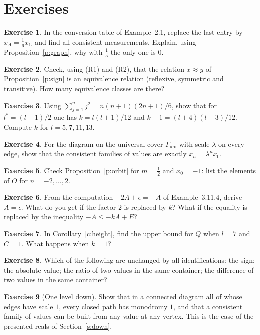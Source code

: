 \documentclass[11pt,a4paper]{article}
\newcommand{\Guni}{\Gamma_{\mathrm{uni}}}
\theoremstyle{plain}
\theoremstyle{definition}
\newtheorem{exercise}{Exercise}
\theoremstyle{remark}
\begin{document}
\section{Exercises}\label{s:ex}
\begin{exercise}
In the conversion table of Example~2.1, replace the last entry by $x_A=\frac16x_C$ and find all consistent measurements.
Explain, using Proposition~\ref{p:graph}, why with $\frac15$ the only one is $0$.
\end{exercise}
\begin{exercise}
Check, using (R1) and (R2), that the relation $x\approx y$ of Proposition~\ref{p:sign} is an equivalence relation
(reflexive, symmetric and transitive). How many equivalence classes are there?
\end{exercise}
\begin{exercise}
Using $\sum_{j=1}^{n}j^2=n(n+1)(2n+1)/6$, show that for $l^*=(l-1)/2$ one has $k=l(l+1)/12$ and $k-1=(l+4)(l-3)/12$. Compute
$k$ for $l=5,7,11,13$.
\end{exercise}
\begin{exercise}
For the diagram on the universal cover $\Guni$ with scale $\lambda$ on every edge, show that the consistent families of
values are exactly $x_n=\lambda^nx_0$.
\end{exercise}
\begin{exercise}
Check Proposition~\ref{p:orbit} for $m=\frac12$ and $x_0=-1$: list the elements of $O$ for $n=-2,\dots,2$.
\end{exercise}
\begin{exercise}
From the computation $-2A+\epsilon=-A$ of Example~3.11.4, derive $A=\epsilon$. What do you get if the factor $2$ is
replaced by $k$? What if the equality is replaced by the inequality $-A\le-kA+E$?
\end{exercise}
\begin{exercise}
In Corollary~\ref{c:height}, find the upper bound for $Q$ when $l=7$ and $C=1$. What happens when $k=1$?
\end{exercise}
\begin{exercise}
Which of the following are unchanged by all identifications: the sign; the absolute value; the ratio of two values in the
same container; the difference of two values in the same container?
\end{exercise}
\begin{exercise}[One level down]
Show that in a connected diagram all of whose edges have scale $1$, every closed path has monodromy $1$, and that a
consistent family of values can be built from any value at any vertex. This is the case of the presented reals of
Section~\ref{s:down}.
\end{exercise}
\end{document}

